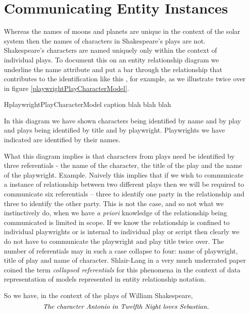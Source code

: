 \section{Communicating Entity Instances}
\label{CommunicatingEntityInstances}


\mynote
Whereas the names of moons and planets are unique in the context of the solar system then the names of characters in Shakespeare's plays are not. Shakespeare's characters are named uniquely only within the context of individual plays. To document this on an entity relationship diagram we underline the name attribute and put a bar through the relationship that contributes to the identification like this \barkerEllisJ, for example, as we illustrate twice over in figure \ref{playwrightPlayCharacterModel}.


\begin{erboxedFigure} {H}{playwrightPlayCharacterModel}
{
caption blah blah blah
 }

\end{erboxedFigure}

In this diagram we have shown characters being identified by name and by play 
and plays being identified by title and by playwright. Playwrights we have indicated are identified by their names.

\mynote What this diagram implies is that characters from plays need be identified by three referentials - the name of the character, the title of the play and the name of the playwright.
Example.
\mynote Naively this implies that if we wish to communicate a instance of relationship between two different plays then we will be required to communicate six referentials
 -- three to identify one party in the relationship and three to identify the other party. This is not the case, and so not what we instinctively do, when we have \textit{a priori} knowledge of the relationship being communicated is limited in scope. If we know the relationship is confined to individual playwrights or is internal to individual play or script then clearly we do not have to communicate the playwright and play title twice over. The number of referentials may in such a case collapse to four: name of playwright, title of play and name of character.
Shlair-Lang in a very much underrated paper coined the term \textit{collapsed referentials} for this phenomena in the context of data representation of models represented in entity relationship notation.

\mynote 
So we have, in the context of the plays of William Shakespeare,
\begin{equation}
\label{AntonioLovesSebastian2}
\mbox{\textit{The character Antonio in Twelfth Night loves Sebastian.}}
\end{equation} 

